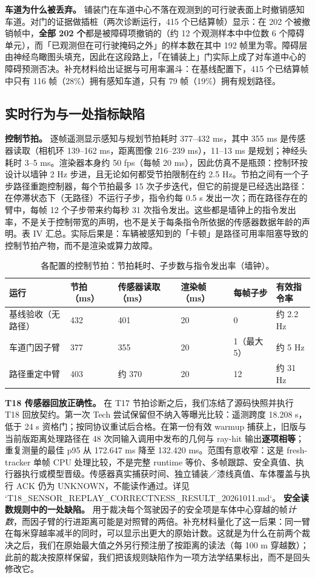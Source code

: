 \documentclass[journal]{IEEEtran}
\begin{document}
\textbf{车道为什么被丢弃。} 铺装门在车道中心不落在观测到的可行驶表面上时撤销感知车道。对门的证据做插桩（两次诊断运行，415 个已结算帧）显示：在 202 个被撤销帧中，\textbf{全部 202 个}都是被障碍项撤销的（约 12 个观测样本中中位数 6 个障碍单元），而「已观测但在可行驶掩码之外」的样本数在其中 192 帧里为零。障碍层由神经鸟瞰图头填充，因此在这段路上，「在铺装上」门实际上成了对车道中心的障碍预测否决。补充材料给出证据与可用率漏斗：在基线配置下，415 个已结算帧中只有 116 帧（28\%）拥有感知车道，只有 79 帧（19\%）拥有规划路径。
\subsection{实时行为与一处指标缺陷}
\textbf{控制节拍。} 逐帧遥测显示感知与规划节拍耗时 377--432 ms，其中 355 ms 是传感器读取（相机环 139--162 ms，距离图像 216--239 ms），11--13 ms 是规划；神经头耗时 3--5 ms。渲染器本身约 50 fps（每帧 20 ms），因此仿真不是瓶颈：控制环按设计以墙钟 2 Hz 步进，且无论如何都受节拍限制在约 2.5 Hz。节拍之间有一个子步路径重跑控制器，每个节拍最多 15 次子步迭代，但它的前提是已经选出路径：在停滞状态下（无路径）不运行子步，指令约每 0.5 s 发出一次；而在路径存在的臂中，每帧 12 个子步带来约每秒 31 次指令发出。这些都是墙钟上的指令发出率，不是关于控制带宽的声明，也不是关于每条指令所依据的传感器数据年龄的声明。表 IV 汇总。实际后果是：车辆被感知到的「卡顿」是路径可用率阻塞导致的控制节拍产物，而不是渲染或算力故障。
\begin{table}[!t]
\centering
\caption{各配置的控制节拍：节拍耗时、子步数与指令发出率（墙钟）。}
\begin{tabular}{@{}llllll@{}}
\toprule
运行 & 节拍（ms） & 传感器读取（ms） & 渲染帧（ms） & 每帧子步 & 有效指令率 \\
\midrule
基线验收（无路径） & 432 & 401 & 20 & 0 & 约 2.2 Hz \\
车道门因子臂 & 377 & 355 & 20 & 1（最大 5） & 约 5 Hz \\
路径重定中臂 & 403 & 约 370 & 20 & 12 & 约 31 Hz \\
\bottomrule
\end{tabular}
\end{table}
\textbf{T18 传感器回放正确性。} 在 T17 节拍诊断之后，我们冻结了源码快照并执行 T18 回放契约。第一次 Tech 尝试保留但不纳入等曝光比较：遥测跨度 18.208 s，低于 24 s 资格门；按同协议重试后合格。在第一份有效 warmup 捕获上，旧版与当前版距离处理路径在 48 次同输入调用中发布的几何与 ray-hit 输出\textbf{逐项相等}；重复测量的最佳 p95 从 172.647 ms 降至 132.420 ms。范围有意收窄：这是 fresh-tracker 单帧 CPU 处理比较，不是完整 runtime 等价、多帧跟踪、安全真值、执行器执行或模型晋级。传感器真实捕获时间、独立铺装／漆线真值、车体覆盖与执行 ACK 仍为 UNKNOWN，不能读作通过。详见 `T18_SENSOR_REPLAY_CORRECTNESS_RESULT_20261011.md`。
\textbf{安全读数规则中的一处缺陷。} 用于裁决每个驾驶因子的安全项是车体中心穿越的帧\emph{计数}，而因子臂的行进距离可能是对照臂的两倍。补充材料量化了这一后果：同一臂在每米穿越率减半的同时，可以显示出更大的原始计数。这就是为什么在前两个裁决之后，我们在原始最大值之外另行预注册了按距离的读法（每 100 m 穿越数）；此前的裁决按原样保留，我们把该规则缺陷作为一项方法学结果标出，而不是回头修改它。
\end{document}
